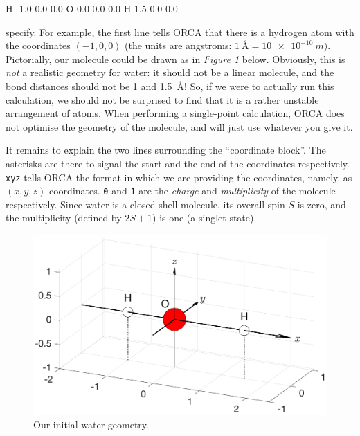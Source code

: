 \documentclass[10pt]{article}
\newcommand{\figref}[1]{\textit{Figure \ref{fig:#1}}}
\begin{document}
\begin{cmdline}
H -1.0 0.0 0.0
O  0.0 0.0 0.0
H  1.5 0.0 0.0
\end{cmdline}

specify. For example, the first line tells ORCA that there is a hydrogen atom with the coordinates \((-1, 0, 0)\) (the units are angstroms: \(\SI{1}{\angstrom} = \SI{10e-10}{m})\). Pictorially, our molecule could be drawn as in \figref{h2obadgeom} below. Obviously, this is \textit{not} a realistic geometry for water: it should not be a linear molecule, and the  bond distances should not be 1 and \SI{1.5}{\angstrom}! So, if we were to actually run this calculation, we should not be surprised to find that it is a rather unstable arrangement of atoms. When performing a single-point calculation, ORCA does not optimise the geometry of the molecule, and will just use whatever you give it.

It remains to explain the two lines surrounding the ``coordinate block''. The asterisks are there to signal the start and the end of the coordinates respectively. \texttt{xyz} tells ORCA the format in which we are providing the coordinates, namely, as \((x, y, z)\)-coordinates. \texttt{0} and \texttt{1} are the \textit{charge} and \textit{multiplicity} of the molecule respectively. Since water is a closed-shell molecule, its overall spin $S$ is zero, and the multiplicity (defined by $2S + 1$) is one (a singlet state).

\begin{figure}[H]
    \centering
    \includegraphics[scale=0.4]{./img/h2obadgeom}
    \caption{Our initial water geometry.}
    \label{fig:h2obadgeom}
\end{figure}
\end{document}
